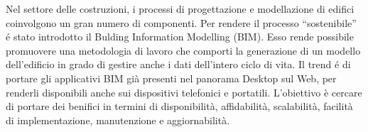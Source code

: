 Nel settore delle costruzioni, i processi di progettazione e modellazione di edifici coinvolgono un gran numero di componenti.
Per rendere il processo ``sostenibile'' \'e stato introdotto il Bulding Information Modelling (BIM). Esso rende possibile promuovere
una metodologia di lavoro che comporti la generazione di un modello dell'edificio in grado di gestire anche i dati
dell’intero ciclo di vita.
Il trend \'e di portare gli applicativi BIM già presenti nel panorama Desktop sul Web, per renderli disponibili anche
sui dispositivi telefonici e portatili. L'obiettivo \`e cercare di portare dei benifici in termini di disponibilità, affidabilità, scalabilità,
facilità di implementazione, manutenzione e aggiornabilità.\\
